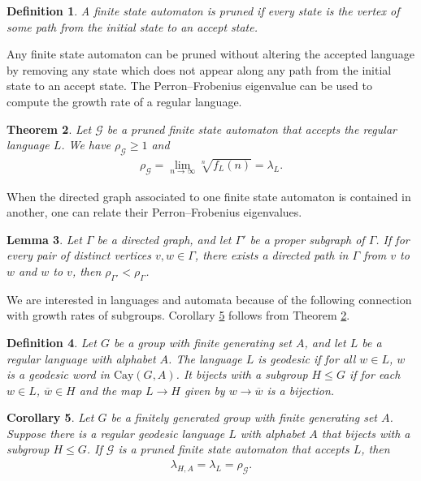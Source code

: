 \documentclass[10pt,a4paper]{amsart}
\newtheorem{theorem}{Theorem}[section]
\newtheorem{lemma}[theorem]{Lemma}
\newtheorem{corollary}[theorem]{Corollary}
\newtheorem{definition}[theorem]{Definition}
\begin{document}
\begin{definition}
    A finite state automaton is \emph{pruned} if every state is the vertex of some path from the initial state to an accept state.
\end{definition}
Any finite state automaton can be pruned without altering the accepted language by removing any state which does not appear along any path from the initial state to an accept state. The Perron--Frobenius eigenvalue can be used to compute the growth rate of a regular language.

\begin{theorem}\cite[Theorem~3.6]{DFW}\label{thm:DFW-3-6}
    Let $\mathcal{G}$ be a pruned finite state automaton that accepts the regular language $L$. We have $\rho_{\mathcal{G}} \geq 1$ and
    \begin{align*}
        \rho_{\mathcal{G}} = \lim_{n \rightarrow \infty} \sqrt[n]{f_L(n)} = \lambda_L\text{.}
    \end{align*}
\end{theorem}
When the directed graph associated to one finite state automaton is contained in another, one can relate their Perron--Frobenius eigenvalues.
\begin{lemma}\cite[Lemma~3.2 and Theorem~3.4]{DFW}
    Let $\Gamma$ be a directed graph, and let $\Gamma'$ be a proper subgraph of $\Gamma$. If for every pair of distinct vertices $v,w \in \Gamma$, there exists a directed path in $\Gamma$ from $v$ to $w$ and $w$ to $v$, then $\rho_{\Gamma'} < \rho_{\Gamma}$.
\end{lemma}

We are interested in languages and automata because of the following connection with growth rates of subgroups. Corollary \ref{cor:growth-by-automaton} follows from Theorem \ref{thm:DFW-3-6}.
\begin{definition}
    Let $G$ be a group with finite generating set $A$, and let $L$ be a regular language with alphabet $A$. The language $L$ is \emph{geodesic} if for all $w \in L$, $w$ is a geodesic word in $\text{Cay}(G,A)$. It \emph{bijects with a subgroup} $H \leq G$ if for each $w \in L$, $\overline{w} \in H$ and the map $L \rightarrow H$ given by $w \rightarrow \overline{w}$ is a bijection.
\end{definition}
\begin{corollary}\label{cor:growth-by-automaton}
    Let $G$ be a finitely generated group with finite generating set $A$. Suppose there is a regular geodesic language $L$ with alphabet $A$ that bijects with a subgroup $H \leq G$. If $\mathcal{G}$ is a pruned finite state automaton that accepts $L$, then
    \begin{align*}
        \lambda_{H,A} = \lambda_L = \rho_{\mathcal{G}}\text{.}
    \end{align*}
\end{corollary}
\end{document}

